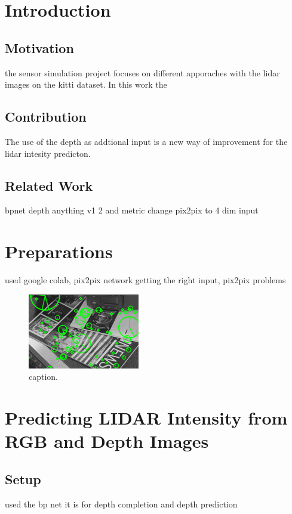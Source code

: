 \chapter{Introduction}
\label{chap:intro}

\section{Motivation}
\label{sect:motivation}
the sensor simulation project focuses on different apporaches with the lidar images on the kitti dataset. In this work the 
\section{Contribution}
The use of the depth as addtional input is a new way of improvement for the lidar intesity predicton.
\section{Related Work}
bpnet depth anything v1 2 and metric change pix2pix to 4 dim input
\chapter{Preparations}
used google colab, pix2pix network getting the right input, pix2pix problems
\begin{figure}[!ht]
	\centering
	\includegraphics[width=0.9\linewidth]{image.jpg}
	\caption{caption.}
	\label{img:example}
\end{figure}
\chapter{Predicting LIDAR Intensity from RGB and Depth Images}
\section{Setup}
used the bp net it is for depth completion and depth prediction

